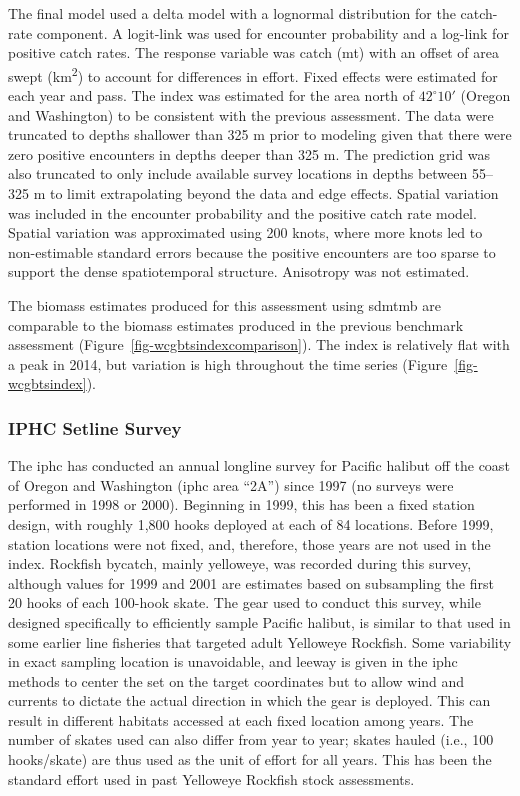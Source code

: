 \documentclass[
]{scrartcl}
\begin{document}
The final model used a delta model with a lognormal distribution for the
catch-rate component. A logit-link was used for encounter probability
and a log-link for positive catch rates. The response variable was catch
(mt) with an offset of area swept (km\textsuperscript{2}) to account for
differences in effort. Fixed effects were estimated for each year and
pass. The index was estimated for the area north of \(42^{\circ}10'\)
(Oregon and Washington) to be consistent with the previous assessment.
The data were truncated to depths shallower than 325 m prior to modeling
given that there were zero positive encounters in depths deeper than 325
m. The prediction grid was also truncated to only include available
survey locations in depths between 55--325 m to limit extrapolating
beyond the data and edge effects. Spatial variation was included in the
encounter probability and the positive catch rate model. Spatial
variation was approximated using 200 knots, where more knots led to
non-estimable standard errors because the positive encounters are too
sparse to support the dense spatiotemporal structure. Anisotropy was not
estimated.

The biomass estimates produced for this assessment using \gls{sdmtmb}
are comparable to the biomass estimates produced in the previous
benchmark assessment (Figure~\ref{fig-wcgbtsindexcomparison}). The index
is relatively flat with a peak in 2014, but variation is high throughout
the time series (Figure~\ref{fig-wcgbtsindex}).

\subsubsection{IPHC Setline Survey}\label{iphc-setline-survey}

The \gls{iphc} has conducted an annual longline survey for Pacific
halibut off the coast of Oregon and Washington (\gls{iphc} area ``2A'')
since 1997 (no surveys were performed in 1998 or 2000). Beginning in
1999, this has been a fixed station design, with roughly 1,800 hooks
deployed at each of 84 locations. Before 1999, station locations were
not fixed, and, therefore, those years are not used in the index.
Rockfish bycatch, mainly yelloweye, was recorded during this survey,
although values for 1999 and 2001 are estimates based on subsampling the
first 20 hooks of each 100-hook skate. The gear used to conduct this
survey, while designed specifically to efficiently sample Pacific
halibut, is similar to that used in some earlier line fisheries that
targeted adult Yelloweye Rockfish. Some variability in exact sampling
location is unavoidable, and leeway is given in the \gls{iphc} methods
to center the set on the target coordinates but to allow wind and
currents to dictate the actual direction in which the gear is deployed.
This can result in different habitats accessed at each fixed location
among years. The number of skates used can also differ from year to
year; skates hauled (i.e., 100 hooks/skate) are thus used as the unit of
effort for all years. This has been the standard effort used in past
Yelloweye Rockfish stock assessments.
\end{document}
